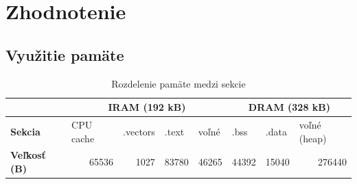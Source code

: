 \chapter{Zhodnotenie}


\section{Využitie pamäte}
\begin{table}[h]
\def\arraystretch{1.25}
\begin{tabular}{|l|llll|lll|}
\hline
                     & \multicolumn{4}{c|}{\textbf{IRAM (192 kB)}}                                                                              & \multicolumn{3}{c|}{\textbf{DRAM (328 kB)}}                                           \\ \hline
\textbf{Sekcia}      & \multicolumn{1}{l|}{CPU cache} & \multicolumn{1}{l|}{.vectors} & \multicolumn{1}{l|}{.text} & voľné                      & \multicolumn{1}{l|}{.bss}  & \multicolumn{1}{l|}{.data} & voľné (heap)                \\ \hline
\textbf{Veľkosť (B)} & \multicolumn{1}{r|}{65536}     & \multicolumn{1}{r|}{1027}     & \multicolumn{1}{r|}{83780} & \multicolumn{1}{r|}{46265} & \multicolumn{1}{r|}{44392} & \multicolumn{1}{r|}{15040} & \multicolumn{1}{r|}{276440} \\ \hline
\end{tabular}
\caption{Rozdelenie pamäte medzi sekcie}
\end{table}

